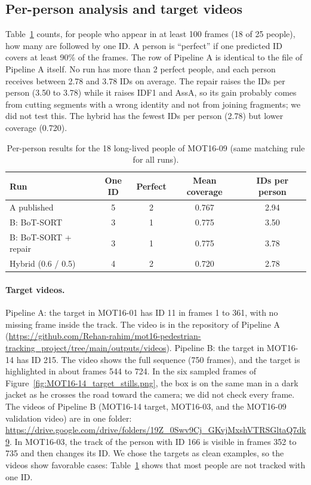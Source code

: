 \documentclass[11pt,letterpaper]{article}
\begin{document}
\subsection{Per-person analysis and target videos}\label{sec:perperson}
Table~\ref{tab:person} counts, for people who appear in at least 100 frames (18 of 25 people), how many are followed by one ID.
A person is ``perfect'' if one predicted ID covers at least 90\% of the frames.
The row of Pipeline A is identical to the file of Pipeline A itself.
No run has more than 2 perfect people, and each person receives between 2.78 and 3.78 IDs on average.
The repair raises the IDs per person (3.50 to 3.78) while it raises IDF1 and AssA, so its gain probably comes from cutting segments with a wrong identity and not from joining fragments; we did not test this.
The hybrid has the fewest IDs per person (2.78) but lower coverage (0.720).

\begin{table}[ht]
\centering\small
\caption{Per-person results for the 18 long-lived people of MOT16-09 (same matching rule for all runs).}\label{tab:person}
\begin{tabular}{lcccc}
\toprule
Run & One ID & Perfect & Mean coverage & IDs per person \\
\midrule
A published & 5 & 2 & 0.767 & 2.94 \\
B: BoT-SORT & 3 & 1 & 0.775 & 3.50 \\
B: BoT-SORT + repair & 3 & 1 & 0.775 & 3.78 \\
Hybrid (0.6 / 0.5) & 4 & 2 & 0.720 & 2.78 \\
\bottomrule
\end{tabular}
\end{table}

\paragraph{Target videos.}
Pipeline A: the target in MOT16-01 has ID 11 in frames 1 to 361, with no missing frame inside the track.
The video is in the repository of Pipeline A (\url{https://github.com/Rehan-rahim/mot16-pedestrian-tracking_project/tree/main/outputs/videos}).
Pipeline B: the target in MOT16-14 has ID 215.
The video shows the full sequence (750 frames), and the target is highlighted in about frames 544 to 724.
In the six sampled frames of Figure~\ref{fig:MOT16-14_target_stills.png}, the box is on the same man in a dark jacket as he crosses the road toward the camera; we did not check every frame.
The videos of Pipeline B (MOT16-14 target, MOT16-03, and the MOT16-09 validation video) are in one folder: \url{https://drive.google.com/drive/folders/19Z_0Swv9Cj_GKvjMxshVTRSGltaQ7dk9}.
In MOT16-03, the track of the person with ID 166 is visible in frames 352 to 735 and then changes its ID.
We chose the targets as clean examples, so the videos show favorable cases: Table~\ref{tab:person} shows that most people are not tracked with one ID.
\end{document}
